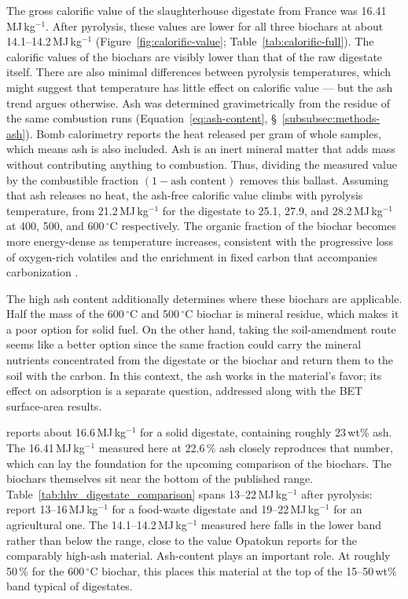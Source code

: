 The gross calorific value of the slaughterhouse digestate from France was 16.41\,MJ\,kg$^{-1}$. After pyrolysis, these values are lower for all three biochars at about 14.1--14.2\,MJ\,kg$^{-1}$ (Figure~\ref{fig:calorific-value}; Table~\ref{tab:calorific-full}). The calorific values of the biochars are visibly lower than that of the raw digestate itself. There are also minimal differences between pyrolysis temperatures, which might suggest that temperature has little effect on calorific value — but the ash trend argues otherwise. Ash was determined gravimetrically from the residue of the same combustion runs (Equation~\ref{eq:ash-content}, \S~\ref{subsubsec:methods-ash}). Bomb calorimetry reports the heat released per gram of whole samples, which means ash is also included. Ash is an inert mineral matter that adds mass without contributing anything to combustion. Thus, dividing the measured value by the combustible fraction $(1 - \text{ash content})$ removes this ballast. Assuming that ash releases no heat, the ash-free calorific value climbs with pyrolysis temperature, from 21.2\,MJ\,kg$^{-1}$ for the digestate to 25.1, 27.9, and 28.2\,MJ\,kg$^{-1}$ at 400, 500, and 600\,$^{\circ}$C respectively. The organic fraction of the biochar becomes more energy-dense as temperature increases, consistent with the progressive loss of oxygen-rich volatiles and the enrichment in fixed carbon that accompanies carbonization \parencite{pecchi-2019, hung-2017}. 

The high ash content additionally determines where these biochars are applicable. Half the mass of the 600\,$^{\circ}$C and 500\,$^{\circ}$C biochar is mineral residue, which makes it a poor option for solid fuel. On the other hand, taking the soil-amendment route seems like a better option since the same fraction could carry the mineral nutrients concentrated from the digestate or the biochar and return them to the soil with the carbon. In this context, the ash works in the material's favor; its effect on adsorption is a separate question, addressed along with the BET surface-area results.

\vspace{0.3em}

\textcite{hung-2017} reports about 16.6\,MJ\,kg$^{-1}$ for a solid digestate, containing roughly 23\,wt\% ash. The 16.41\,MJ\,kg$^{-1}$ measured here at 22.6\,\% ash closely reproduces that number, which can lay the foundation for the upcoming comparison of the biochars. The biochars themselves sit near the bottom of the published range. Table~\ref{tab:hhv_digestate_comparison} spans 13--22\,MJ\,kg$^{-1}$ after pyrolysis: \textcite{opatokun-2015} report 13--16\,MJ\,kg$^{-1}$ for a food-waste digestate and \textcite{kujawska-2026} 19--22\,MJ\,kg$^{-1}$ for an agricultural one. The 14.1--14.2\,MJ\,kg$^{-1}$ measured here falls in the lower band rather than below the range, close to the value Opatokun reports for the comparably high-ash material. Ash-content plays an important role. At roughly 50\,\% for the 600\,$^{\circ}$C biochar, this places this material at the top of the 15--50\,wt\% band typical of digestates.

